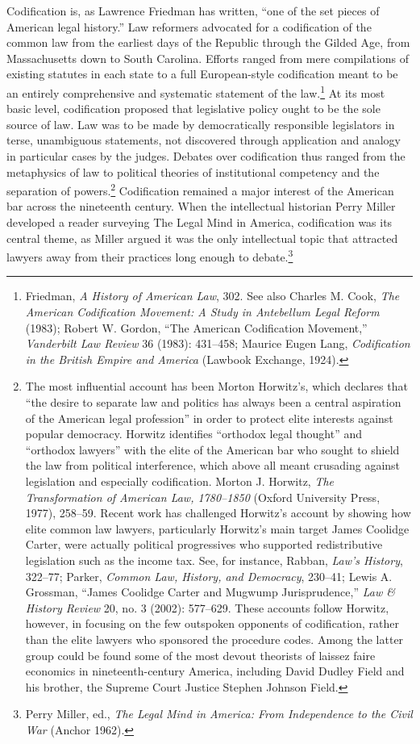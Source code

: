 \documentclass[12pt,]{article}
\let\rmarkdownfootnote\footnote%
\def\footnote{\protect\rmarkdownfootnote}
\begin{document}
Codification is, as Lawrence Friedman has written, ``one of the set
pieces of American legal history.'' Law reformers advocated for a
codification of the common law from the earliest days of the Republic
through the Gilded Age, from Massachusetts down to South Carolina.
Efforts ranged from mere compilations of existing statutes in each state
to a full European-style codification meant to be an entirely
comprehensive and systematic statement of the law.\footnote{Friedman,
  \emph{A History of American Law}, 302. See also Charles M. Cook,
  \emph{The American Codification Movement: A Study in Antebellum Legal
  Reform} (1983); Robert W. Gordon, ``The American Codification
  Movement,'' \emph{Vanderbilt Law Review} 36 (1983): 431--458; Maurice
  Eugen Lang, \emph{Codification in the British Empire and America}
  (Lawbook Exchange, 1924).} At its most basic level, codification
proposed that legislative policy ought to be the sole source of law. Law
was to be made by democratically responsible legislators in terse,
unambiguous statements, not discovered through application and analogy
in particular cases by the judges. Debates over codification thus ranged
from the metaphysics of law to political theories of institutional
competency and the separation of powers.\footnote{The most influential
  account has been Morton Horwitz's, which declares that ``the desire to
  separate law and politics has always been a central aspiration of the
  American legal profession'' in order to protect elite interests
  against popular democracy. Horwitz identifies ``orthodox legal
  thought'' and ``orthodox lawyers'' with the elite of the American bar
  who sought to shield the law from political interference, which above
  all meant crusading against legislation and especially codification.
  Morton J. Horwitz, \emph{The Transformation of American Law,
  1780--1850} (Oxford University Press, 1977), 258--59. Recent work has
  challenged Horwitz's account by showing how elite common law lawyers,
  particularly Horwitz's main target James Coolidge Carter, were
  actually political progressives who supported redistributive
  legislation such as the income tax. See, for instance, Rabban,
  \emph{Law's History}, 322--77; Parker, \emph{Common Law, History, and
  Democracy}, 230--41; Lewis A. Grossman, ``James Coolidge Carter and
  Mugwump Jurisprudence,'' \emph{Law \& History Review} 20, no. 3
  (2002): 577--629. These accounts follow Horwitz, however, in focusing
  on the few outspoken opponents of codification, rather than the elite
  lawyers who sponsored the procedure codes. Among the latter group
  could be found some of the most devout theorists of laissez faire
  economics in nineteenth-century America, including David Dudley Field
  and his brother, the Supreme Court Justice Stephen Johnson Field.}
Codification remained a major interest of the American bar across the
nineteenth century. When the intellectual historian Perry Miller
developed a reader surveying The Legal Mind in America, codification was
its central theme, as Miller argued it was the only intellectual topic
that attracted lawyers away from their practices long enough to
debate.\footnote{Perry Miller, ed., \emph{The Legal Mind in America:
  From Independence to the Civil War} (Anchor 1962).}
\end{document}
